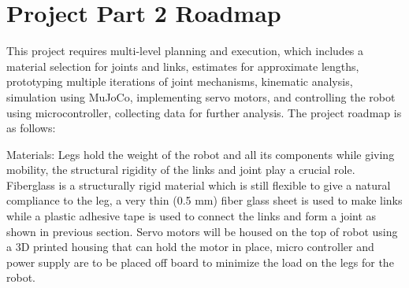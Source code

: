 \documentclass[12pt]{article}
\begin{document}






\section*{Project Part 2 Roadmap}

This project requires multi-level planning and execution, which includes a material selection for joints and links, estimates for approximate lengths, prototyping multiple iterations of joint mechanisms, kinematic analysis, simulation using MuJoCo, implementing servo motors, and controlling the robot using microcontroller, collecting data for further analysis. The project roadmap is as follows:

Materials: Legs hold the weight of the robot and all its components while giving mobility, the structural rigidity of the links and joint play a crucial role. Fiberglass is a structurally rigid material which is still flexible to give a natural compliance to the leg, a very thin (0.5 mm) fiber glass sheet is used to make links while a plastic adhesive tape is used to connect the links and form a joint as shown in previous section. Servo motors will be housed on the top of robot using a 3D printed housing that can hold the motor in place, micro controller and power supply are to be placed off board to minimize the load on the legs for the robot.
\end{document}
